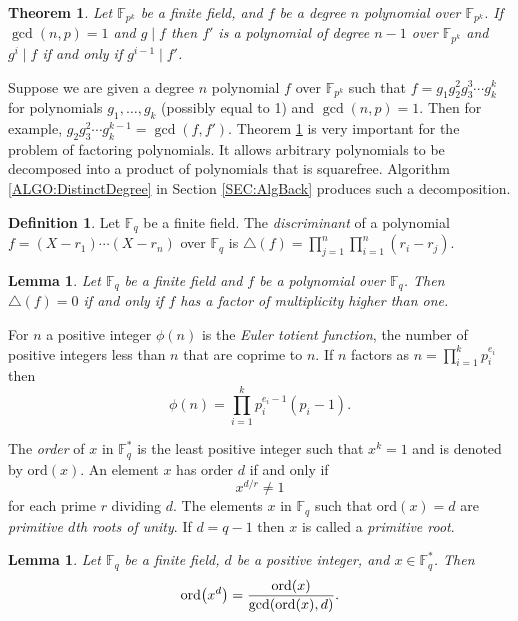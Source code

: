 \documentclass{article}
\let\originalleft\left
\let\originalright\right
\renewcommand{\left}{\mathopen{}\mathclose\bgroup\originalleft}
\renewcommand{\right}{\aftergroup\egroup\originalright}
\newcounter{dummy} \numberwithin{dummy}{section}
\theoremstyle{plain}
\newtheorem{thm}[dummy]{Theorem}
\newtheorem{lem}[dummy]{Lemma}
\theoremstyle{definition}
\newtheorem{mydef}[dummy]{Definition}
\def\Fq {{ \mathbb{F} _ {q} }}
\def\FQ {{ \mathbb{F}^* _ {q} }}
\def\FpE {{ \mathbb{F} _ {p^k} }}
\def\ord {{ \mathrm{ord} }}
\begin{document}
		\begin{thm}
		\label{THM:sqfIdea}
			Let $\FpE$ be a finite field, and $f$ be a degree $n$ polynomial over $\FpE$. If $\gcd(n,p)=1$ and $g \mid f$ then $f'$ is a polynomial of degree $n-1$ over $\FpE$ and $g^i \mid f$ if and only if $g^{i-1} \mid f'$. 
		\end{thm}

		Suppose we are given a degree $n$ polynomial $f$ over $\FpE$ such that $f=g_1g_2^{2}g_3^{3} \cdots g_k^{k}$ for polynomials $g_1,\ldots,g_k$ (possibly equal to 1) and $\gcd(n,p)=1$. Then for example, $g_2g_3^2 \cdots g_k^{k-1} = \gcd(f,f')$. Theorem \ref{THM:sqfIdea} is very important for the problem of factoring polynomials. It allows arbitrary polynomials to be decomposed into a product of polynomials that is squarefree. Algorithm \ref{ALGO:DistinctDegree} in Section \ref{SEC:AlgBack} produces such a decomposition. 
		
	  \begin{mydef}
		\label{DEF:DISCRIM}
		    Let $\Fq$ be a finite field. The \emph{discriminant} of a polynomial $f=(X-r_1)\cdots(X-r_n)$ over $\Fq$ is $\bigtriangleup(f) = \prod_{j=1}^n{ \prod_{i=1}^n{(r_i-r_j)} }$.
		\end{mydef}
		
		\begin{lem}
		\label{LEM:DISCRIMZERO}
		    Let $\Fq$ be a finite field and $f$ be a polynomial over $\Fq$. Then $\bigtriangleup(f)=0$ if and only if $f$ has a factor of multiplicity higher than one. 
		\end{lem}
				
		For $n$ a positive integer $\phi(n)$ is the \emph{Euler totient function}, the number of positive integers less than $n$ that are coprime to $n$. If $n$ factors as $n=\prod_{i=1}^k{p_i^{e_i}}$ then 
		\[ \phi(n)=\prod_{i=1}^k{p_i^{e_i-1}(p_i-1)}. \]
		
		The \emph{order} of $x$ in $\FQ$ is the least positive integer such that $x^k=1$ and is denoted by $\ord(x)$. An element $x$ has order $d$ if and only if 
		\[ x^{d/r} \not= 1\]
		\noindent for each prime $r$ dividing $d$. The elements $x$ in $\Fq$ such that $\ord(x) = d$ are  \emph{primitive $d$th roots of unity}. If $d=q-1$ then $x$ is called a  \emph{primitive root}. 
		
		\begin{lem}
		\label{LEM:LOWERORD}
		    Let $\Fq$ be a finite field, $d$ be a positive integer, and $x \in \FQ$. Then 
				\[ \ord \left(x^d \right)=\frac{\ord(x)}{\gcd(\ord(x),d)}. \] 
		\end{lem}
		
\end{document}
